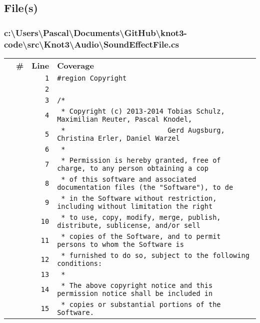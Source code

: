 \documentclass[a4paper,10pt]{article}
\begin{document}
\subsection{File(s)}
\subsubsection{c:\textbackslash Users\textbackslash Pascal\textbackslash Documents\textbackslash GitHub\textbackslash knot3-code\textbackslash src\textbackslash Knot3\textbackslash Audio\textbackslash SoundEffectFile.cs}
\begin{longtable}[l]{lrrl}
\textbf{} & \textbf{\#} & \textbf{Line} & \textbf{Coverage}\\
\cellcolor{gray} &  & \verb~1~ & \verb~#region Copyright~\\
\cellcolor{gray} &  & \verb~2~ & \verb~~\\
\cellcolor{gray} &  & \verb~3~ & \verb~/*~\\
\cellcolor{gray} &  & \verb~4~ & \verb~ * Copyright (c) 2013-2014 Tobias Schulz, Maximilian Reuter, Pascal Knodel,~\\
\cellcolor{gray} &  & \verb~5~ & \verb~ *                         Gerd Augsburg, Christina Erler, Daniel Warzel~\\
\cellcolor{gray} &  & \verb~6~ & \verb~ *~\\
\cellcolor{gray} &  & \verb~7~ & \verb~ * Permission is hereby granted, free of charge, to any person obtaining a cop~\\
\cellcolor{gray} &  & \verb~8~ & \verb~ * of this software and associated documentation files (the "Software"), to de~\\
\cellcolor{gray} &  & \verb~9~ & \verb~ * in the Software without restriction, including without limitation the right~\\
\cellcolor{gray} &  & \verb~10~ & \verb~ * to use, copy, modify, merge, publish, distribute, sublicense, and/or sell~\\
\cellcolor{gray} &  & \verb~11~ & \verb~ * copies of the Software, and to permit persons to whom the Software is~\\
\cellcolor{gray} &  & \verb~12~ & \verb~ * furnished to do so, subject to the following conditions:~\\
\cellcolor{gray} &  & \verb~13~ & \verb~ *~\\
\cellcolor{gray} &  & \verb~14~ & \verb~ * The above copyright notice and this permission notice shall be included in ~\\
\cellcolor{gray} &  & \verb~15~ & \verb~ * copies or substantial portions of the Software.~\\

\end{longtable}
\end{document}
